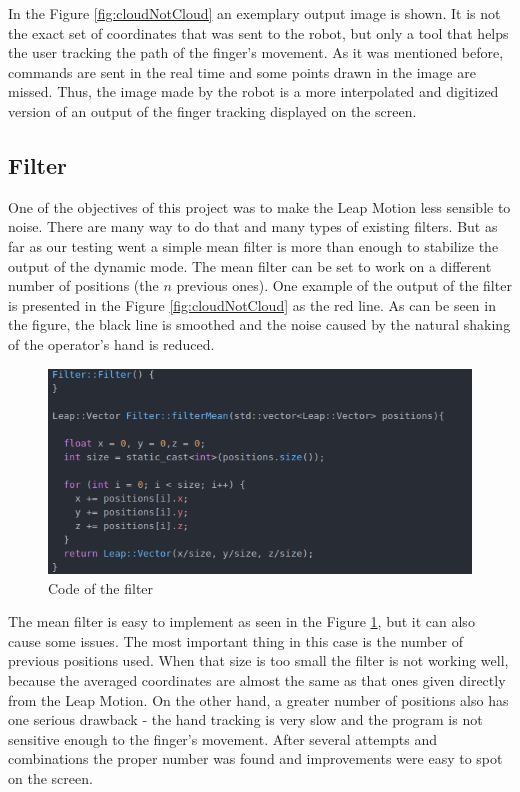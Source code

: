 In the Figure \ref{fig:cloudNotCloud} an exemplary output image is shown. It is not the exact set of coordinates that was sent to the robot, but only a tool that helps the user tracking the path of the finger's movement. As it was mentioned before, commands are sent in the real time and some points drawn in the image are missed. Thus, the image made by the robot is a more interpolated and digitized version of an output of the finger tracking displayed on the screen.

\subsection{Filter}

One of the objectives of this project was to make the Leap Motion less sensible to noise. There are many way to do that and many types of existing filters. But as far as our testing went a simple mean filter is more than enough to stabilize the output of the dynamic mode. The mean filter can be set to work on a different number of positions (the $n$ previous ones).
One example of the output of the filter is presented in the Figure \ref{fig:cloudNotCloud} as the red line. As can be seen in the figure, the black line is smoothed and the noise caused by the natural shaking of the operator's hand is reduced.

\begin{figure}[H]
	\includegraphics[scale = 0.5]{codeFilter}
	\centering
	\caption{Code of the filter}
	\label{fig:filter}
\end{figure}

The mean filter is easy to implement as seen in the Figure \ref{fig:filter}, but it can also cause some issues. The most important thing in this case is the number of previous positions used. When that size is too small the filter is not working well, because the averaged coordinates are almost the same as that ones given directly from the Leap Motion. On the other hand, a greater number of positions also has one serious drawback - the hand tracking is very slow and the program is not sensitive enough to the finger's movement. After several attempts and combinations the proper number was found and improvements were easy to spot on the screen.
